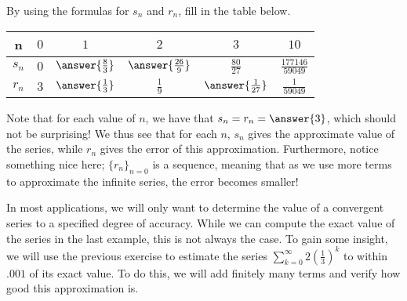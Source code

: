 \documentclass{ximera}
\begin{document}
\begin{example}
By using the formulas for $s_n$ and $r_n$, fill in the table below.  

\begin{center}
\begin{tabular}{c | c | c | c | c | c }
n& $0$ & $1$ & $2$ & $3$ & $10$ \\ [2 ex]
\hline
$s_n$ & $0$ &$ \answer{\frac{8}{3}}$ & $\answer{\frac{26}{9}}$ & $\frac{80}{27}$ & $\frac{177146}{59049}$ \\ [2 ex]
\hline
$r_n$ & $3$ & $\answer{\frac{1}{3}}$ & $\frac{1}{9}$ & $\answer{\frac{1}{27}}$ & $\frac{1}{59049}$
\end{tabular}
\end{center}

Note that for each value of $n$, we have that $s_n = r_n = \answer{3}$, which should not be surprising!  We thus see that for each $n$, $s_n$ gives the approximate value of the series, while $r_n$ gives the error of this approximation.  Furthermore, notice something nice here; $\{r_n\}_{n=0}$ is a  sequence, meaning that as we use more terms to approximate the infinite series, the error becomes smaller! 
\end{example}

In most applications, we will only want to determine the value of a convergent series to a specified degree of accuracy.  While we can compute the exact value of the series in the last example, this is not always the case.  To gain some insight, we will use the previous exercise to estimate the series  $\sum_{k=0}^{\infty} 2\left(\frac{1}{3}\right)^k$ to within $.001$ of its exact value.  To do this, we will add finitely many terms and verify how good this approximation is.
\end{document}
